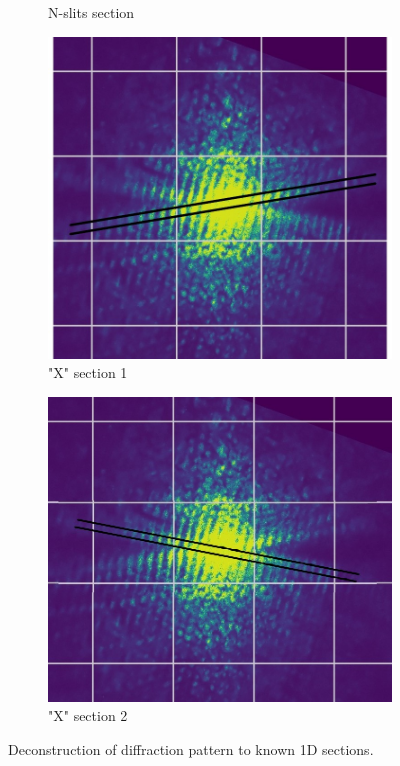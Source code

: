 \begin{figure}[H]
\begin{subfigure}{0.48\columnwidth}
        \caption{N-slits section}
        \label{fig:HelixSection2}
    \end{subfigure}
    \begin{subfigure}{0.46\columnwidth}
        \centering
        \includegraphics[width=\columnwidth]{figures/HelixSection4.jpg} %
        \caption{"X" section 1}
        \label{fig:HelixSection3}
    \end{subfigure}
    \begin{subfigure}{0.48\columnwidth}
        \centering
        \includegraphics[width=\columnwidth]{figures/HelixSection3.jpg} %
        \caption{"X" section 2}
        \label{fig:HelixSection4}
    \end{subfigure}
    \caption{Deconstruction of diffraction pattern to known 1D sections.}
    \label{fig:HelixSections}
\end{figure}